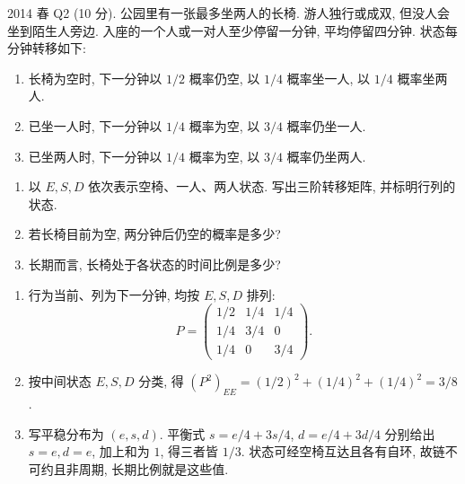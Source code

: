\begin{exercise}\label{ex:fe2014q2}
2014 春 Q2 (10 分). 公园里有一张最多坐两人的长椅. 游人独行或成双, 但没人会坐到陌生人旁边. 入座的一个人或一对人至少停留一分钟, 平均停留四分钟. 状态每分钟转移如下:
\begin{enumerate}[label=(\roman*)]
\item 长椅为空时, 下一分钟以 $1/2$ 概率仍空, 以 $1/4$ 概率坐一人, 以 $1/4$ 概率坐两人.
\item 已坐一人时, 下一分钟以 $1/4$ 概率为空, 以 $3/4$ 概率仍坐一人.
\item 已坐两人时, 下一分钟以 $1/4$ 概率为空, 以 $3/4$ 概率仍坐两人.
\end{enumerate}
\begin{enumerate}[label=(\alph*)]
\item\label{ex:fe2014q2-a} 以 $E,S,D$ 依次表示空椅、一人、两人状态. 写出三阶转移矩阵, 并标明行列的状态.
\item\label{ex:fe2014q2-b} 若长椅目前为空, 两分钟后仍空的概率是多少?
\item\label{ex:fe2014q2-c} 长期而言, 长椅处于各状态的时间比例是多少?
\end{enumerate}
\end{exercise}
\begin{solution}
\begin{enumerate}[label=(\alph*)]
\item\label{sol:fe2014q2-a} 行为当前、列为下一分钟, 均按 $E,S,D$ 排列:
\[
 P=\begin{pmatrix}1/2&1/4&1/4\\1/4&3/4&0\\1/4&0&3/4\end{pmatrix}.
\]
\item\label{sol:fe2014q2-b} 按中间状态 $E,S,D$ 分类, 得 $(P^2)_{EE}=(1/2)^2+(1/4)^2+(1/4)^2=3/8$.
\item\label{sol:fe2014q2-c} 写平稳分布为 $(e,s,d)$. 平衡式 $s=e/4+3s/4$, $d=e/4+3d/4$ 分别给出 $s=e,d=e$, 加上和为 $1$, 得三者皆 $1/3$. 状态可经空椅互达且各有自环, 故链不可约且非周期, 长期比例就是这些值.
\end{enumerate}
\end{solution}

